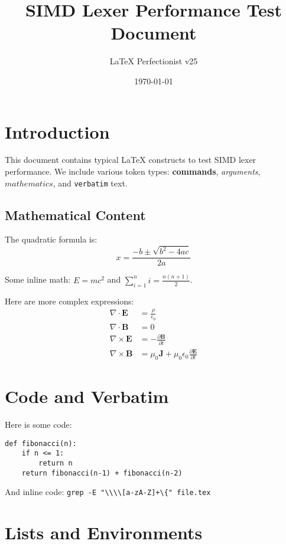 \documentclass{article}
\title{SIMD Lexer Performance Test Document}
\author{LaTeX Perfectionist v25}
\date{\today}
\begin{document}
\maketitle

\section{Introduction}

This document contains typical \LaTeX{} constructs to test SIMD lexer performance. 
We include various token types: \textbf{commands}, \textit{arguments}, $mathematics$, 
and \verb|verbatim| text.

\subsection{Mathematical Content}

The quadratic formula is:
\begin{equation}
    x = \frac{-b \pm \sqrt{b^2 - 4ac}}{2a}
\end{equation}

Some inline math: $E = mc^2$ and $\sum_{i=1}^{n} i = \frac{n(n+1)}{2}$.

Here are more complex expressions:
\begin{align}
    \nabla \cdot \mathbf{E} &= \frac{\rho}{\epsilon_0} \\
    \nabla \cdot \mathbf{B} &= 0 \\
    \nabla \times \mathbf{E} &= -\frac{\partial \mathbf{B}}{\partial t} \\
    \nabla \times \mathbf{B} &= \mu_0 \mathbf{J} + \mu_0 \epsilon_0 \frac{\partial \mathbf{E}}{\partial t}
\end{align}

\section{Code and Verbatim}

Here is some code:
\begin{verbatim}
def fibonacci(n):
    if n <= 1:
        return n
    return fibonacci(n-1) + fibonacci(n-2)
\end{verbatim}

And inline code: \verb|grep -E "\\\\[a-zA-Z]+\{" file.tex|

\section{Lists and Environments}
\end{document}
